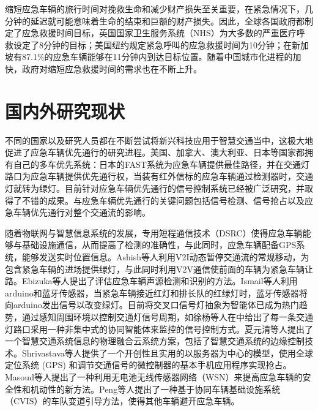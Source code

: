 缩短应急车辆的旅行时间对挽救生命和减少财产损失至关重要，在紧急情况下，几分钟的延迟就可能意味着生命的结束和巨额的财产损失。因此，全球各国政府都制定了应急救援时间目标，英国国家卫生服务系统（NHS）为大多数的严重医疗呼救设定了8分钟的目标\cite{NHS}；美国纽约规定紧急呼叫的应急救援时间为10分钟\cite{george_1}；在新加坡有87.1\%的应急车辆能够在11分钟内到达目标位置\cite{Singapore}。随着中国城市化进程的加快，政府对缩短应急救援时间的需求也在不断上升。




\section{国内外研究现状}
不同的国家以及研究人员都在不断尝试将新兴科技应用于智慧交通当中，这极大地促进了应急车辆优先通行的研究进程。美国\cite{2018Ghanim}、加拿大、澳大利亚、日本等国家都拥有自己的多车优先系统：日本的FAST系统为应急车辆提供最佳路径，并在交通灯路口为应急车辆提供优先通行权，当装有红外信标的应急车辆通过检测器时，交通灯就转为绿灯\cite{2019Constrained}。目前针对应急车辆优先通行的信号控制系统已经被广泛研究，并取得了不错的成果\cite{koike_study_2003}。与应急车辆优先通行的关键问题包括信号检测\cite{2016Chen,nellore2016traffic,2020Yao}、信号抢占以及应急车辆优先通行对整个交通流的影响。

随着物联网与智慧信息系统的发展，专用短程通信技术（DSRC）使得应急车辆能够与基础设施通信，从而提高了检测的准确性，与此同时，应急车辆配备GPS系统，能够发送实时位置信息。Ashish等人利用V2I动态暂停交通流的常规移动，为包含紧急车辆的进场提供绿灯，与此同时利用V2V通信使前面的车辆为紧急车辆让路\cite{Ashish_2021}。Ebizuka等人提出了评估应急车辆声源检测和识别的方法\cite{Ebizuka_2019}。Ismail等人利用arduino和蓝牙传感器，当紧急车辆接近红灯和排长队的红绿灯时，蓝牙传感器将向arduino发出信号以改变绿灯。目前将交叉口信号灯抽象为智能体已成为热门趋势，通过感知周围环境以控制交通灯信号周期\cite{2020Automated,2017Younes}，如徐杨等人在\cite{xuyang}中给出了每一条交通灯路口采用一种非集中式的协同智能体来监控的信号控制方式。夏元清等人\cite{xiayuanqing}提出了一个智慧交通系统信息的物理融合云系统方案，包括了智慧交通系统的边缘控制技术。Shrivastava等人提供了一个开创性且实用的以服务器为中心的模型，使用全球定位系统 (GPS) 和调节交通信号的微控制器的基本手机应用程序实现抢占\cite{Shrivastava_2019}。Masoud等人提出了一种利用无电池无线传感器网络（WSN）来提高应急车辆的安全性和机动性的新方法\cite{Masoud_2017}。Peng等人提出了一种基于协同车辆基础设施系统（CVIS）的车队变道引导方法，使得其他车辆避开应急车辆\cite{Peng_2021}。



